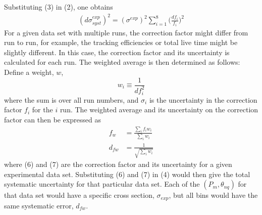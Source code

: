 \documentclass[11pt]{article}
\begin{document}
Substituting (3) in (2), one obtains
\begin{align}
  (d\sigma^{exp}_{syst})^{2} = (\sigma^{exp})^{2}\sum_{i=1}^{8} \Big( \frac{df_{i}}{f_{i}}\Big)^{2}
\end{align}
For a given data set with multiple runs, the correction factor might differ from run to run, for example, the tracking efficiencies or total
live time might be slightly different. In this case, the correction factor and its uncertainty is calculated for each run.  The weighted average is
then determined as follows: \\
Define a weight, $w$, 
\begin{equation}
  w_{i} \equiv \frac{1}{df_{i}^{2}}
\end{equation}
where the sum is over all run numbers, and $\sigma_{i}$ is the uncertainty in the correction factor $f_{i}$ for the $i$ run.
The weighted average and its uncertainty on the correction factor can then be expressed as
\begin{align}
  f_{w} &= \frac{\sum_{i}f_{i}w_{i}}{\sum_{i}w_{i}} \\
  d_{fw} &= \frac{1}{\sqrt{\sum_{i}w_{i}}}
\end{align}
where (6) and (7) are the correction factor and its uncertainty for a given experimental data set.
Substituting (6) and (7) in (4) would then give the total systematic uncertainty for  that particular data set.
Each of the $(P_{m}, \theta_{nq})$ for that data set would have a specific cross section, $\sigma_{exp}$, but all
bins would have the same systematic error, $d_{fw}$.
\end{document}
